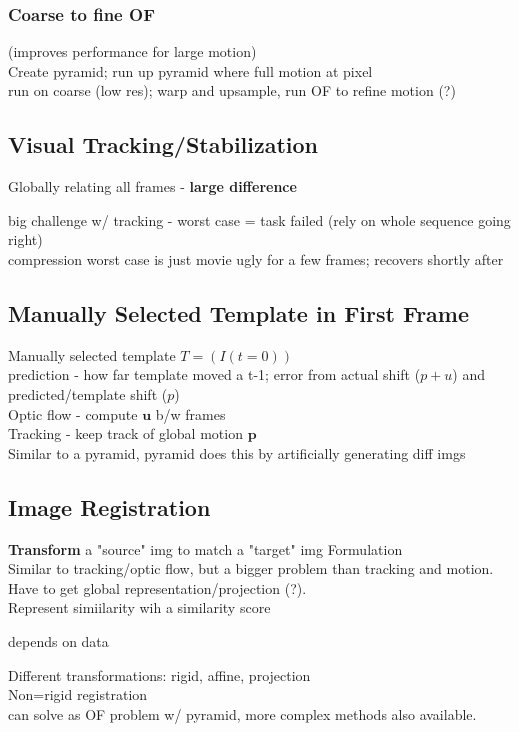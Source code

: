 \documentclass{article}
\begin{document}
\subsubsection{Coarse to fine OF}
(improves performance for large motion)\\
Create pyramid; run up pyramid where full motion at pixel
\\
run on coarse (low res); warp and upsample, run OF to refine motion (?)

\subsection{Visual Tracking/Stabilization}
Globally relating all frames - \textbf{large difference}
\begin{list}{}{}
    \item 
\end{list}
big challenge w/ tracking - worst case = task failed (rely on whole sequence going right)
\\
compression worst case is just movie ugly for a few frames; recovers shortly after

\subsection{Manually Selected Template in First Frame}
Manually selected template $T= (I(t=0))$\\
prediction - how far template moved a t-1; error from actual shift ($p+u$) and predicted/template shift ($p$)
\\
Optic flow - compute $\mathbf u$ b/w frames \\
Tracking - keep track of global motion $\mathbf p$
\\
Similar to a pyramid, pyramid does this by artificially generating diff imgs
\noindent

\subsection{Image Registration}
\textbf{Transform} a "source" img to match a "target" img
\noindent
Formulation
\\
Similar to tracking/optic flow, but a bigger problem than tracking and motion.\\
Have to get global representation/projection (?). \\
Represent simiilarity wih a similarity score
\begin{list}{}{}
    \item depends on data
\end{list}
Different transformations: rigid, affine, projection 
\\
Non=rigid registration\\
can solve as OF problem w/ pyramid, more complex methods also available.
\end{document}

